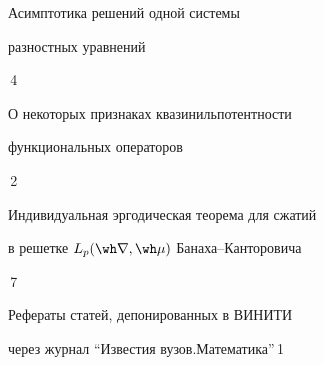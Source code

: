 

{Асимптотика решений одной системы


разностных уравнений}{\No\,4}




{О некоторых признаках квазинильпотентности\newline


функциональных операторов}{\No\,2}




{Индивидуальная эргодическая теорема для сжатий  \newline


в решетке $L_p(\wh\nabla,\wh\mu)$ Банаха--Канторовича}{\No\,7}


\medskip











\noindent Рефераты статей, депонированных в ВИНИТИ 


через журнал ``Известия вузов.\newline Математика''\dotfill \No\,1











